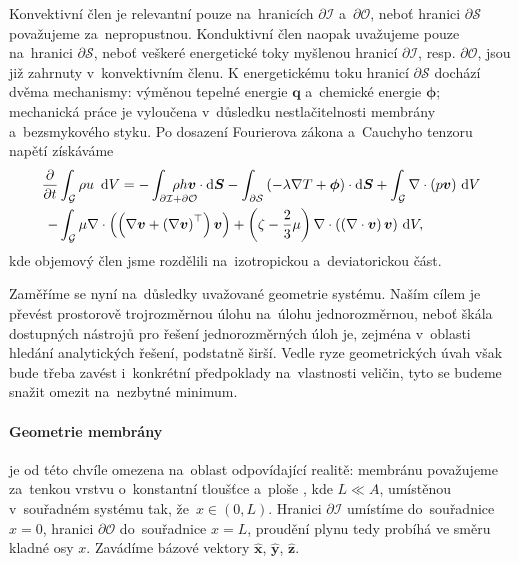 Konvektivní člen je relevantní pouze na~hranicích $\partial\mathcal{I}$ a~$\partial\mathcal{O}$, neboť hranici $\partial\mathcal{S}$ považujeme za~nepropustnou. Konduktivní člen naopak uvažujeme pouze na~hranici $\partial\mathcal{S}$, neboť veškeré energetické toky myšlenou hranicí $\partial\mathcal{I}$, resp. $\partial\mathcal{O}$, jsou již zahrnuty v~konvektivním členu. K energetickému toku hranicí $\partial\mathcal{S}$ dochází dvěma mechanismy: výměnou tepelné energie $\bm{q}$ a~chemické energie $\bm{\phi}$; mechanická práce je vyloučena v~důsledku nestlačitelnosti membrány a~bezsmykového styku. Po dosazení Fourierova zákona a~Cauchyho tenzoru napětí získáváme
\begin{align}\label{eq:1st_law_detailed}
    \dd{}{t}&\int_{\mathcal{G}}\rho u~\d{V}
    =-\int_{\partial\mathcal{I}+\partial\mathcal{O}} \mkern-36mu \rho h \bm{v} \cdot \dvec{S}
    -\int_{\partial\mathcal{S}}\left(-\lambda \nabla T +\bm{\phi}\right)\cdot\dvec{S}
    +\int_{\mathcal{G}}\nabla\cdot\left(p\bm{v}\right)\d{V}\nonumber\\
    -&\int_{\mathcal{G}}\mu\nabla\cdot\left(\left(\nabla \bm{v}+\left(\nabla\bm{v}\right)^\top\right)\bm{v}\right)+
    \left(\zeta-\frac{2}{3}\mu\right)\nabla\cdot\left(\left(\nabla\cdot\bm{v}\right)\bm{v}\right)\d{V},
\end{align}
kde objemový člen jsme rozdělili na~izotropickou a~deviatorickou část.

Zaměříme se nyní na~důsledky uvažované geometrie systému. Naším cílem je převést prostorově trojrozměrnou úlohu na~úlohu jednorozměrnou, neboť škála dostupných nástrojů pro řešení jednorozměrných úloh je, zejména v~oblasti hledání analytických řešení, podstatně širší. Vedle ryze geometrických úvah však bude třeba zavést i~konkrétní předpoklady na~vlastnosti veličin, tyto se budeme snažit omezit na~nezbytné minimum. 

\paragraph{Geometrie membrány} je od této chvíle omezena na~oblast odpovídající realitě: membránu považujeme za~tenkou vrstvu o~konstantní tloušťce  a~ploše , kde $L\ll A$, umístěnou v~souřadném systému tak, že~$x\in\left(0,L\right)$. Hranici $\partial\mathcal{I}$ umístíme do~souřadnice $x=0$, hranici $\partial\mathcal{O}$ do~souřadnice $x=L$, proudění plynu tedy probíhá ve směru kladné osy $x$. Zavádíme bázové vektory $\bm{\hat{x}}$, $\bm{\hat{y}}$, $\bm{\hat{z}}$.

